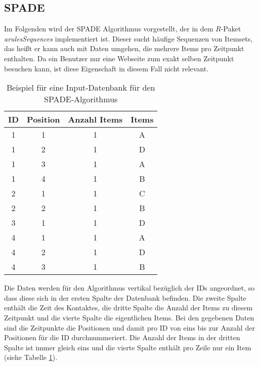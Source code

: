 \subsection{SPADE}
Im Folgenden wird der SPADE Algorithmus \cite{spade} vorgestellt, der in dem $R$-Paket \textit{arulesSequences} \cite{arulesSequences} implementiert ist. Dieser sucht häufige Sequenzen von Itemsets, das heißt er kann auch mit Daten umgehen, die mehrere Items pro Zeitpunkt enthalten. Da ein Benutzer nur eine Webseite zum exakt selben Zeitpunkt besuchen kann, ist diese Eigenschaft in diesem Fall nicht relevant.\\
\begin{table}[H]
\centering
\begin{tabular}{c|c|c|c}
ID & Position  & Anzahl Items & Items \\ \hline
1  & 1				 & 1						& A \\
1  & 2				 & 1						& D \\
1  & 3				 & 1						& A \\
1  & 4				 & 1						& B \\
2  & 1				 & 1						& C \\
2  & 2				 & 1						& B \\
3  & 1				 & 1						& D \\
4  & 1				 & 1						& A \\
4  & 2				 & 1						& D \\
4  & 3				 & 1						& B \\
\end{tabular}
\caption{Beispiel für eine Input-Datenbank für den SPADE-Algorithmus}\label{input}
\end{table}
\noindent Die Daten werden für den Algorithmus vertikal bezüglich der IDs angeordnet, so dass diese sich in der ersten Spalte der Datenbank befinden. Die zweite Spalte enthält die Zeit des Kontaktes, die dritte Spalte die Anzahl der Items zu diesem Zeitpunkt und die vierte Spalte die eigentlichen Items. Bei den gegebenen Daten sind die Zeitpunkte die Positionen und damit pro ID von eins bis zur Anzahl der Positionen für die ID durchnummeriert. Die Anzahl der Items in der dritten Spalte ist immer gleich eins und die vierte Spalte enthält pro Zeile nur ein Item (siehe Tabelle \ref{input}).\\

